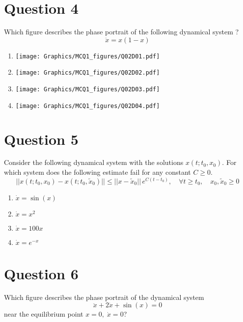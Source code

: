 \documentclass[twoside,10pt,a4paper]{article}
\begin{document}
\section*{Question 4}
Which figure describes the phase portrait of the following dynamical system ?
\begin{equation*}
	\ddot{x} = x(1 - x)
\end{equation*}

\begin{enumerate}[label=(\alph*)]
	\item  \texttt{[image: Graphics/MCQ1\_figures/Q02D01.pdf]}
	\item  \texttt{[image: Graphics/MCQ1\_figures/Q02D02.pdf]}
	\item  \texttt{[image: Graphics/MCQ1\_figures/Q02D03.pdf]}
	\item  \texttt{[image: Graphics/MCQ1\_figures/Q02D04.pdf]}
\end{enumerate}

\section*{Question 5}
Consider the following dynamical system with the solutions $x(t; t_0, x_0)$. For which system does the following estimate fail for any constant $C \geq 0$.
\begin{equation*}
	||x(t; t_0, x_0) - x(t; t_0, \tilde{x}_0) || \leq ||x - \tilde{x}_0||\,e^{C(t-t_0)}, \quad \forall t \geq t_0, \quad x_0, \tilde{x}_0 \geq 0
\end{equation*}

\begin{enumerate}[label=(\alph*)]
	\item $ \dot{x} = \sin(x) $
	\item $ \dot{x} = x^2 $
	\item $ \dot{x} = 100x $
	\item $ \dot{x} = e^{-x} $
\end{enumerate}

\section*{Question 6}
Which figure describes the phase portrait of the dynamical system
\begin{equation*}
	\ddot{x} + 2\dot{x} + \sin(x) = 0
\end{equation*}
near the equilibrium point $x = 0, \; \dot{x} = 0$?
\end{document}
